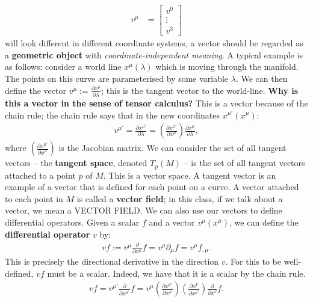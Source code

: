 \documentclass[11pt]{article}
\theoremstyle{definition}
\begin{document}
\begin{align*}
	v^\mu & = \begin{bmatrix}
		v^0 \\
		\vdots \\
		v^3 
	\end{bmatrix} 
\end{align*} 
will look different in different coordinate systems, a vector should be regarded as a \textbf{geometric object} with \emph{coordinate-independent meaning}. A typical example is as follows: consider a world line \( x^\mu(\lambda) \) which is moving through the manifold. The points on this curve are parameterised by some variable \( \lambda \). We can then define the vector \( v^\mu := \frac{ \partial x^\mu }{ \partial \lambda} \); this is the tangent vector to the world-line. 
\newline
\newline
\textbf{Why is this a vector in the sense of tensor calculus?} This is a vector because of the chain rule; the chain rule says that in the new coordinates \( x^{\mu'}(x^\mu) \): 
\begin{align*}
	v^{\mu'} = \frac{\partial x^{\mu'}}{\partial \lambda} = \left( \frac{\partial x^{\mu'}}{\partial x^\mu} \right) \frac{\partial x^\mu}{\partial \lambda }, 
\end{align*}
where \( \left( \frac{\partial x^{\mu'}}{\partial x^\mu} \right) \) is the Jacobian matrix.  We can consider the set of all tangent vectors -- the \textbf{tangent space}, denoted \( T_p(M) \) -- is the set of all tangent vectors attached to a point \( p \) of \( M \). This is a vector space. A tangent vector is an example of a vector that is defined for each point on a curve. A vector attached to each point in \( M \) is called a \textbf{vector field}; in this class, if we talk about a vector, we mean a VECTOR FIELD.
\newline
\newline
We can also use our vectors to define differential operators. Given a scalar \( f \) and a vector \( v^\mu (x^\mu) \), we can define the \textbf{differential operator} \( v \) by:
\begin{align*}
	vf := v^\mu \frac{\partial }{\partial x^\mu} f = v^\mu \partial_\mu f = v^\mu f_{ , \mu}. 
\end{align*}
This is precisely the directional derivative in the direction \( v \). For this to be well-defined, \( vf \) must be a scalar. Indeed, we have that it is a scalar by the chain rule. 
\begin{align*}
	vf = v^{\mu'} \frac{\partial }{\partial x^{\mu'}} f = v^\mu \left( \frac{\partial x^{\mu'}}{\partial x^\mu} \right) \left( \frac{\partial x^\nu}{\partial x^{\mu'}} \right) \frac{\partial}{\partial x^\nu}f. 
\end{align*}
\end{document}
